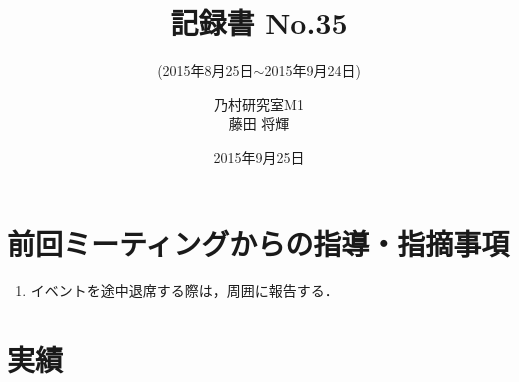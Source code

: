 \documentclass[fleqn, 14pt]{extarticle}
\subtitle{(2015年8月25日$\sim$2015年9月24日)}
\author{乃村研究室M1\\藤田 将輝}
\date{2015年9月25日}
\title{記録書 No.35}
\begin{document}
    \maketitle

    \section{前回ミーティングからの指導・指摘事項}
    \label{sec-1}
    \begin{enumerate}
        \item イベントを途中退席する際は，周囲に報告する．
            \newline
            \hfill

    \end{enumerate}

    \section{実績}
    \label{sec-2}
\end{document}
